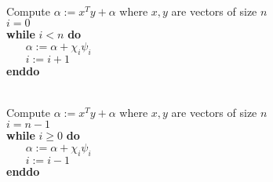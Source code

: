 \documentclass[12pt]{article}
\begin{document}
~\\[1in]
Compute $ \alpha := x^T y + \alpha $ where $ x, y $ are vectors of size $ n $ \\[1in]
$ i = 0 $ \\[1in]
{\bf while} $ i < n $ {\bf do} \\[1in]
$~~~~~~~~ \alpha := \alpha + \chi_i \psi_i $ \\[1in]
$~~~~~~~~ i := i+1 $ \\[1in]
{\bf enddo}

\newpage

~\\[1in]
Compute $ \alpha := x^T y + \alpha $ where $ x, y $ are vectors of size $ n $ \\[1in]
$ i = n-1 $ \\[1in]
{\bf while} $ i \geq 0 $ {\bf do} \\[1in]
$~~~~~~~~ \alpha := \alpha + \chi_i \psi_i $ \\[1in]
$~~~~~~~~ i := i-1 $ \\[1in]
{\bf enddo}


\newpage

\resetsteps

\begin{center}
	\FlaWorksheet
\end{center}
\end{document}
